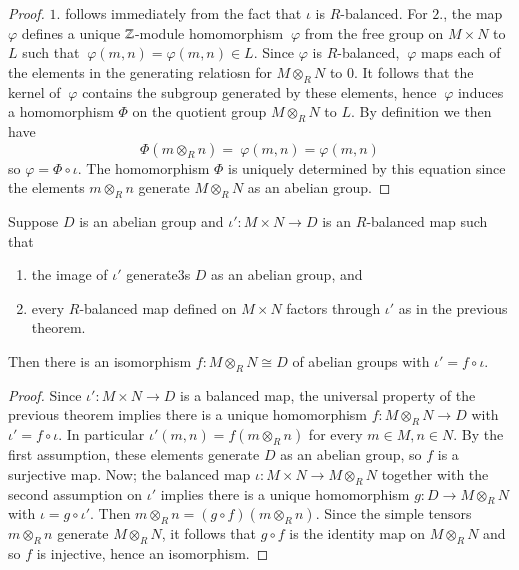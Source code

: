 \documentclass[12pt, a4paper, oneside, openright, titlepage]{book}
\begin{document}
\begin{proof}
    $1.$ follows immediately from the fact that $\iota$ is $R$-balanced. For $2.$, the map $\varphi$ defines a unique $\mathbb Z$-module homomorphism $~\varphi$ from the free group on $M\times N$ to $L$ such that $~\varphi(m,n) = \varphi(m,n) \in L$. Since $\varphi$ is $R$-balanced, $~\varphi$ maps each of the elements in the generating relatiosn for $M\otimes_RN$ to $0$. It follows that the kernel of $~\varphi$ contains the subgroup generated by these elements, hence $~\varphi$ induces a homomorphism $\Phi$ on the quotient group $M\otimes_RN$ to $L$. By definition we then have \begin{equation*}
        \Phi(m\otimes_Rn) = ~\varphi(m,n) = \varphi(m,n)
    \end{equation*}
    so $\varphi = \Phi\circ\iota$. The homomorphism $\Phi$ is uniquely determined by this equation since the elements $m\otimes_Rn$ generate $M\otimes_RN$ as an abelian group.
\end{proof}

\begin{cor}
    Suppose $D$ is an abelian group and $\iota':M\times N\rightarrow D$ is an $R$-balanced map such that \begin{enumerate}
        \item the image of $\iota'$ generate3s $D$ as an abelian group, and 
        \item every $R$-balanced map defined on $M\times N$ factors through $\iota'$ as in the previous theorem.
    \end{enumerate}
    Then there is an isomorphism $f:M\otimes_RN\cong D$ of abelian groups with $\iota' = f\circ \iota$.
\end{cor}
\begin{proof}
    Since $\iota':M\times N\rightarrow D$ is a balanced map, the universal property of the previous theorem implies there is a unique homomorphism $f:M\otimes_RN\rightarrow D$ with $\iota' = f\circ \iota$. In particular $\iota'(m,n) = f(m\otimes_Rn)$ for every $m \in M, n \in N$. By the first assumption, these elements generate $D$ as an abelian group, so $f$ is a surjective map. Now; the balanced map $\iota:M\times N\rightarrow M\otimes_R N$ together with the second assumption on $\iota'$ implies there is a unique homomorphism $g:D\rightarrow M\otimes_RN$ with $\iota = g \circ \iota'$. Then $m\otimes_Rn = (g\circ f)(m\otimes_Rn)$. Since the simple tensors $m\otimes_Rn$ generate $M\otimes_RN$, it follows that $g\circ f$ is the identity map on $M\otimes_RN$ and so $f$ is injective, hence an isomorphism.
\end{proof}
\end{document}
